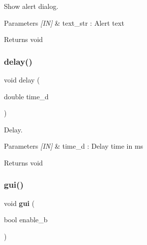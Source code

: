 Show alert dialog. 


\begin{DoxyCode}{0}
\end{DoxyCode}



\begin{DoxyParams}{Parameters}
{\em \mbox{[}\+I\+N\mbox{]}} & text\+\_\+str \+: Alert text \\
\hline
\end{DoxyParams}
\begin{DoxyReturn}{Returns}
void 
\end{DoxyReturn}
\mbox{\label{group___system__object_ga508d73729e3a855e19a0c49af92a53cc}} 
\subsubsection{delay()}
{\footnotesize\ttfamily void delay (\begin{DoxyParamCaption}\item[{double}]{time\+\_\+d }\end{DoxyParamCaption})}



Delay. 


\begin{DoxyCode}{0}
\DoxyCodeLine{\textcolor{comment}{// Delay 1s}}
\end{DoxyCode}



\begin{DoxyParams}{Parameters}
{\em \mbox{[}\+I\+N\mbox{]}} & time\+\_\+d \+: Delay time in ms \\
\hline
\end{DoxyParams}
\begin{DoxyReturn}{Returns}
void 
\end{DoxyReturn}
\mbox{\label{group___system__object_gafcf390e999b3589940075e76b7294dfc}} 
\subsubsection{gui()\hspace{0.1cm}{\footnotesize\ttfamily [1/3]}}
{\footnotesize\ttfamily void \textbf{ gui} (\begin{DoxyParamCaption}\item[{bool}]{enable\+\_\+b }\end{DoxyParamCaption})}



